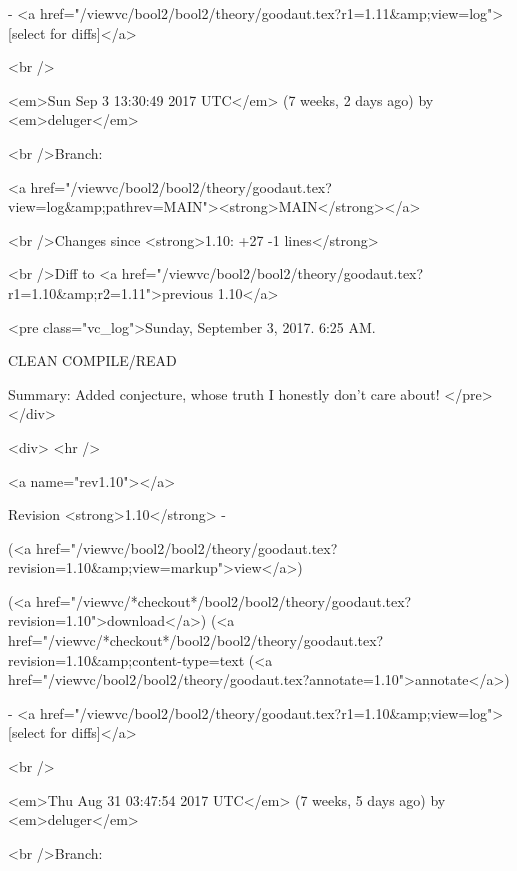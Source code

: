 - <a href="/viewvc/bool2/bool2/theory/goodaut.tex?r1=1.11&amp;view=log">[select for diffs]</a>




<br />

<em>Sun Sep  3 13:30:49 2017 UTC</em>
(7 weeks, 2 days ago)
by <em>deluger</em>


<br />Branch:

<a href="/viewvc/bool2/bool2/theory/goodaut.tex?view=log&amp;pathrev=MAIN"><strong>MAIN</strong></a>







<br />Changes since <strong>1.10: +27 -1 lines</strong>








<br />Diff to <a href="/viewvc/bool2/bool2/theory/goodaut.tex?r1=1.10&amp;r2=1.11">previous 1.10</a>










<pre class="vc_log">Sunday, September 3, 2017.  6:25 AM.

CLEAN COMPILE/READ

Summary: Added conjecture, whose truth I honestly don't care about!
</pre>
</div>



<div>
<hr />

<a name="rev1.10"></a>


Revision <strong>1.10</strong> -


(<a href="/viewvc/bool2/bool2/theory/goodaut.tex?revision=1.10&amp;view=markup">view</a>)


(<a href="/viewvc/*checkout*/bool2/bool2/theory/goodaut.tex?revision=1.10">download</a>)
(<a href="/viewvc/*checkout*/bool2/bool2/theory/goodaut.tex?revision=1.10&amp;content-type=text%
(<a href="/viewvc/bool2/bool2/theory/goodaut.tex?annotate=1.10">annotate</a>)



- <a href="/viewvc/bool2/bool2/theory/goodaut.tex?r1=1.10&amp;view=log">[select for diffs]</a>




<br />

<em>Thu Aug 31 03:47:54 2017 UTC</em>
(7 weeks, 5 days ago)
by <em>deluger</em>


<br />Branch:

